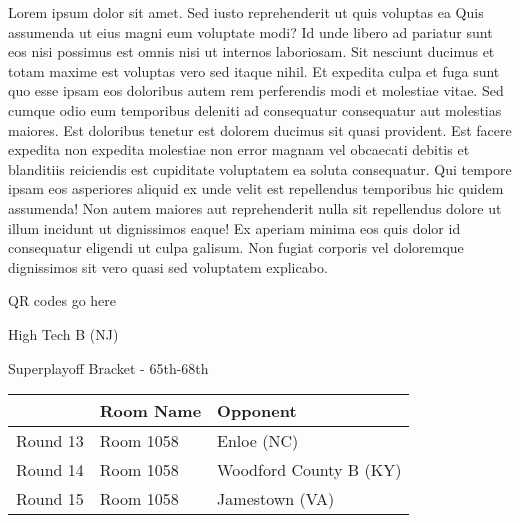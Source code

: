 \documentclass{article}%
\begin{document}
\vspace*{8pt}%
\linebreak%
\newline%
\newline%
Lorem ipsum dolor sit amet. Sed iusto reprehenderit ut quis voluptas ea Quis assumenda ut eius magni eum voluptate modi? Id unde libero ad pariatur sunt eos nisi possimus est omnis nisi ut internos laboriosam. Sit nesciunt ducimus et totam maxime est voluptas vero sed itaque nihil. Et expedita culpa et fuga sunt quo esse ipsam eos doloribus autem rem perferendis modi et molestiae vitae.\newline%
\newline%
Sed cumque odio eum temporibus deleniti ad consequatur consequatur aut molestias maiores. Est doloribus tenetur est dolorem ducimus sit quasi provident. Est facere expedita non expedita molestiae non error magnam vel obcaecati debitis et blanditiis reiciendis est cupiditate voluptatem ea soluta consequatur. Qui tempore ipsam eos asperiores aliquid ex unde velit est repellendus temporibus hic quidem assumenda!\newline%
\newline%
Non autem maiores aut reprehenderit nulla sit repellendus dolore ut illum incidunt ut dignissimos eaque! Ex aperiam minima eos quis dolor id consequatur eligendi ut culpa galisum. Non fugiat corporis vel doloremque dignissimos sit vero quasi sed voluptatem explicabo.\newline%
\newline%
%
\vspace*{30pt}%
\begin{center}%
\begin{Huge}%
QR codes go here%
\end{Huge}%
\end{center}%
\newpage%
\begin{center}%
\begin{Huge}%
High Tech B (NJ)%
\end{Huge}%
\vspace*{8pt}%
\linebreak%
\begin{Large}%
Superplayoff Bracket {-} 65th{-}68th%
\end{Large}%
\end{center}%
%
\begin{tabularx}{\textwidth}{|c|Y|Y|}%
\hline%
&Room Name&Opponent\\%
\hline%
Round 13&Room 1058&Enloe (NC)\\%
Round 14&Room 1058&Woodford County B (KY)\\%
Round 15&Room 1058&Jamestown (VA)\\%
\hline%
\end{tabularx}%
\end{document}
